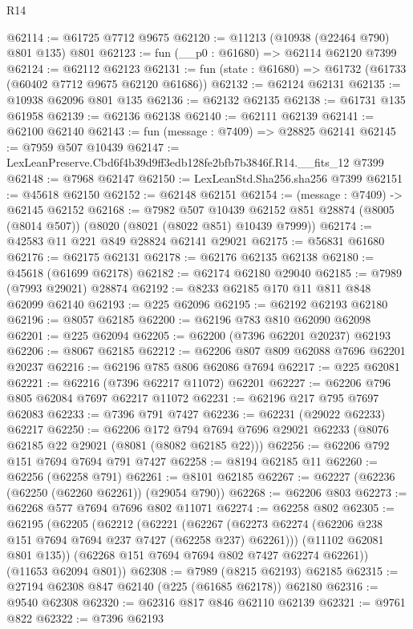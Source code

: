 \begin{lexlean}{R14}
\begin{coremodule}
@62114 := @61725 @7712 @9675
@62120 := @11213 (@10938 (@22464 @790) @801 @135) @801
@62123 := fun (__p0 : @61680) => @62114 @62120 @7399
@62124 := @62112 @62123
@62131 := fun (state : @61680) => @61732 (@61733 (@60402 @7712 @9675 @62120 @61686))
@62132 := @62124 @62131
@62135 := @10938 @62096 @801 @135
@62136 := @62132 @62135
@62138 := @61731 @135 @61958
@62139 := @62136 @62138
@62140 := @62111 @62139
@62141 := @62100 @62140
@62143 := fun (message : @7409) => @28825 @62141
@62145 := @7959 @507 @10439
@62147 := LexLeanPreserve.Cbd6f4b39d9ff3edb128fe2bfb7b3846f.R14.__fits_12 @7399
@62148 := @7968 @62147
@62150 := LexLeanStd.Sha256.sha256 @7399
@62151 := @45618 @62150
@62152 := @62148 @62151
@62154 := (message : @7409) -> @62145 @62152
@62168 := @7982
    @507
    @10439
    @62152
    @851
    @28874
    (@8005 (@8014 @507))
    (@8020 (@8021 (@8022 @851) @10439 @7999))
@62174 := @42583 @11 @221 @849 @28824 @62141 @29021
@62175 := @56831 @61680
@62176 := @62175 @62131
@62178 := @62176 @62135 @62138
@62180 := @45618 (@61699 @62178)
@62182 := @62174 @62180 @29040
@62185 := @7989 (@7993 @29021) @28874
@62192 := @8233 @62185 @170 @11 @811 @848 @62099 @62140
@62193 := @225 @62096
@62195 := @62192 @62193 @62180
@62196 := @8057 @62185
@62200 := @62196 @783 @810 @62090 @62098
@62201 := @225 @62094
@62205 := @62200 (@7396 @62201 @20237) @62193
@62206 := @8067 @62185
@62212 := @62206 @807 @809 @62088 @7696 @62201 @20237
@62216 := @62196 @785 @806 @62086 @7694
@62217 := @225 @62081
@62221 := @62216 (@7396 @62217 @11072) @62201
@62227 := @62206 @796 @805 @62084 @7697 @62217 @11072
@62231 := @62196 @217 @795 @7697 @62083
@62233 := @7396 @791 @7427
@62236 := @62231 (@29022 @62233) @62217
@62250 := @62206
    @172
    @794
    @7694
    @7696
    @29021
    @62233
    (@8076 @62185 @22 @29021 (@8081 (@8082 @62185 @22)))
@62256 := @62206 @792 @151 @7694 @7694 @791 @7427
@62258 := @8194 @62185 @11
@62260 := @62256 (@62258 @791)
@62261 := @8101 @62185
@62267 := @62227 (@62236 (@62250 (@62260 @62261)) (@29054 @790))
@62268 := @62206 @803
@62273 := @62268 @577 @7694 @7696 @802 @11071
@62274 := @62258 @802
@62305 := @62195
    (@62205
      (@62212
        (@62221
          (@62267 (@62273 @62274 (@62206 @238 @151 @7694 @7694 @237 @7427 (@62258 @237) @62261)))
          (@11102 @62081 @801 @135))
        (@62268 @151 @7694 @7694 @802 @7427 @62274 @62261))
      (@11653 @62094 @801))
@62308 := @7989 (@8215 @62193) @62185
@62315 := @27194 @62308 @847 @62140 (@225 (@61685 @62178)) @62180
@62316 := @9540 @62308
@62320 := @62316 @817 @846 @62110 @62139
@62321 := @9761 @822
@62322 := @7396 @62193

\end{coremodule}
\end{lexlean}
